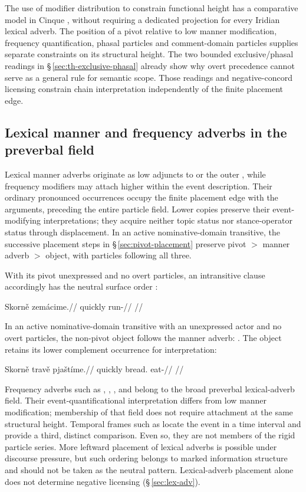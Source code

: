 The use of modifier distribution to constrain functional height has a
comparative model in Cinque \cite{cinque1999}, without requiring a dedicated
projection for every Iridian lexical adverb. The position of a pivot relative
to low manner modification, frequency
quantification, phasal particles and comment-domain particles supplies separate
constraints on its structural height. The two bounded exclusive/phasal readings
in §\,\ref{sec:th-exclusive-phasal} already show why overt precedence cannot
serve as a general rule for semantic scope. Those readings and negative-concord licensing constrain chain interpretation
independently of the finite placement edge.

\subsection{Lexical manner and frequency adverbs in the preverbal field}
\label{sec:lexical-adverb-position}

Lexical manner adverbs originate as low adjuncts to  or the
 outer , while frequency modifiers may attach higher within the
 event description. Their ordinary pronounced occurrences occupy the finite
 placement edge with the arguments, preceding the entire particle field.
 Lower copies preserve their event-modifying interpretations; they acquire
 neither topic status nor stance-operator status through displacement.
 In an active nominative-domain transitive, the successive placement steps in
 §\,\ref{sec:pivot-placement} preserve pivot $>$ manner adverb $>$ object,
 with particles following all three.

\noindent With its pivot unexpressed and no overt particles, an intransitive
clause accordingly has the neutral surface order :

\pex
\a
\begingl
\gla Skorně zemácime.//
\glb quickly run-\Prog{}//
\glft {}//
\endgl
\xe

\noindent In an active nominative-domain transitive with an unexpressed
actor and no overt particles, the non-pivot object follows the manner adverb:
. The object retains its lower complement
occurrence for interpretation:

\pex
\a
\begingl
\gla Skorně travě pjaštíme.//
\glb quickly bread.\Ind{} eat-\Prog{}//
\glft {}//
\endgl
\xe

\noindent Frequency adverbs such as  ,
 ,  , and 
 belong to the broad preverbal lexical-adverb field. Their event-quantificational
interpretation differs from low manner modification; membership of that field
does not require attachment at the same structural height. Temporal frames
such as   locate the event in a time interval and
provide a third, distinct comparison. Even so, they are not members of the rigid particle series. More
leftward placement of lexical adverbs is possible under discourse pressure, but
such ordering belongs to marked information structure and should not be taken
as the neutral pattern. Lexical-adverb placement alone does not determine negative licensing
(§\,\ref{sec:lex-adv}).

